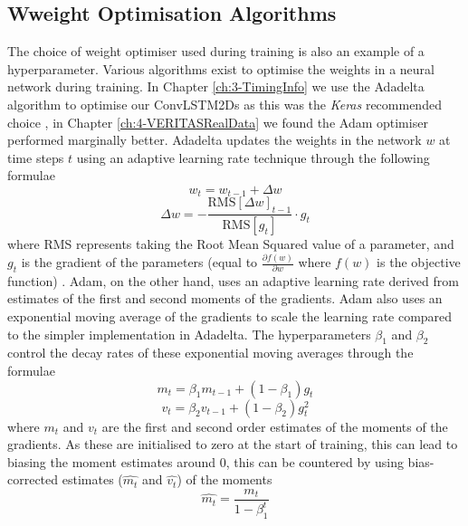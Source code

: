 \subsection{Wweight Optimisation Algorithms}
The choice of weight optimiser used during training is also an example of a hyperparameter. Various algorithms exist to optimise the weights in a neural network during training. In Chapter \ref{ch:3-TimingInfo} we use the Adadelta algorithm to optimise our ConvLSTM2Ds as this was the \textit{Keras} recommended choice \cite{adadelta}, in Chapter \ref{ch:4-VERITASRealData} we found the Adam optimiser \cite{adam} performed marginally better. Adadelta updates the weights in the network $w$ at time steps $t$ using an adaptive learning rate technique through the following formulae
\begin{equation}
    w_{t}=w_{t-1}+\Delta w
    \label{eq:adadelta1}
\end{equation}
\begin{equation}
    \Delta w = - \frac{\textrm{RMS}[\Delta w]_{t-1}}{\textrm{RMS}[g_t]} \cdot g_t
    \label{eq:adadelta2}
\end{equation}
where RMS represents taking the Root Mean Squared value of a parameter, and $g_t$ is the gradient of the parameters (equal to $\frac{\partial f(w)}{\partial w}$ where $f(w)$ is the objective function) \cite{adadelta}. Adam, on the other hand, uses an adaptive learning rate derived from estimates of the first and second moments of the gradients. Adam also uses an exponential moving average of the gradients to scale the learning rate compared to the simpler implementation in Adadelta. The hyperparameters $\beta_1$ and $\beta_2$ control the decay rates of these exponential moving averages through the formulae
\begin{equation}
    m_t=\beta_1 m_{t-1} + (1-\beta_1)g_t
    \label{eq:adam1}
\end{equation}
\begin{equation}
    v_t=\beta_2 v_{t-1} + (1-\beta_2)g_t^2
    \label{eq:adam2}
\end{equation}
where $m_t$ and $v_t$ are the first and second order estimates of the moments of the gradients. As these are initialised to zero at the start of training, this can lead to biasing the moment estimates around 0, this can be countered by using bias-corrected estimates ($\hat{m_t}$ and $\hat{v_t}$) of the moments
\begin{equation}
    \hat{m_t}=\frac{m_t}{1-\beta_1^t}
    \label{eq:adam3}
\end{equation}
